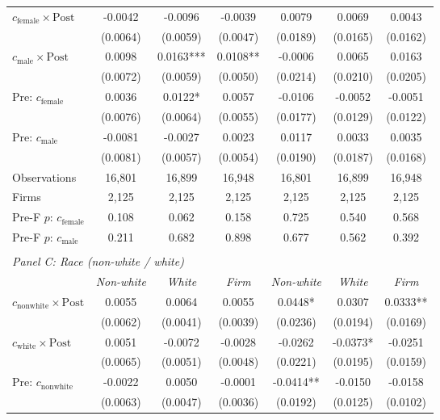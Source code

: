 \begin{table}[H]
\begin{threeparttable}
\begin{tabular}{lcccccc}
\cmidrule(lr){2-4}\cmidrule(lr){5-7}
\quad $c_{\text{female}} \times \text{Post}$ & -0.0042 & -0.0096 & -0.0039 & 0.0079 & 0.0069 & 0.0043 \\
 & (0.0064) & (0.0059) & (0.0047) & (0.0189) & (0.0165) & (0.0162) \\
\quad $c_{\text{male}} \times \text{Post}$ & 0.0098 & 0.0163*** & 0.0108** & -0.0006 & 0.0065 & 0.0163 \\
 & (0.0072) & (0.0059) & (0.0050) & (0.0214) & (0.0210) & (0.0205) \\
\quad Pre: $c_{\text{female}}$ & 0.0036 & 0.0122* & 0.0057 & -0.0106 & -0.0052 & -0.0051 \\
 & (0.0076) & (0.0064) & (0.0055) & (0.0177) & (0.0129) & (0.0122) \\
\quad Pre: $c_{\text{male}}$ & -0.0081 & -0.0027 & 0.0023 & 0.0117 & 0.0033 & 0.0035 \\
 & (0.0081) & (0.0057) & (0.0054) & (0.0190) & (0.0187) & (0.0168) \\
\quad Observations & 16,801 & 16,899 & 16,948 & 16,801 & 16,899 & 16,948 \\
\quad Firms & 2,125 & 2,125 & 2,125 & 2,125 & 2,125 & 2,125 \\
\quad Pre-F $p$: $c_{\text{female}}$ & 0.108 & 0.062 & 0.158 & 0.725 & 0.540 & 0.568 \\
\quad Pre-F $p$: $c_{\text{male}}$ & 0.211 & 0.682 & 0.898 & 0.677 & 0.562 & 0.392 \\
\\[-2pt]
\multicolumn{7}{l}{\textit{Panel C: Race (non-white / white)}} \\
\quad & \textit{Non-white} & \textit{White} & \textit{Firm} & \textit{Non-white} & \textit{White} & \textit{Firm} \\[-2pt]
\cmidrule(lr){2-4}\cmidrule(lr){5-7}
\quad $c_{\text{nonwhite}} \times \text{Post}$ & 0.0055 & 0.0064 & 0.0055 & 0.0448* & 0.0307 & 0.0333** \\
 & (0.0062) & (0.0041) & (0.0039) & (0.0236) & (0.0194) & (0.0169) \\
\quad $c_{\text{white}} \times \text{Post}$ & 0.0051 & -0.0072 & -0.0028 & -0.0262 & -0.0373* & -0.0251 \\
 & (0.0065) & (0.0051) & (0.0048) & (0.0221) & (0.0195) & (0.0159) \\
\quad Pre: $c_{\text{nonwhite}}$ & -0.0022 & 0.0050 & -0.0001 & -0.0414** & -0.0150 & -0.0158 \\
 & (0.0063) & (0.0047) & (0.0036) & (0.0192) & (0.0125) & (0.0102) \\

\end{tabular}
\end{threeparttable}
\end{table}

